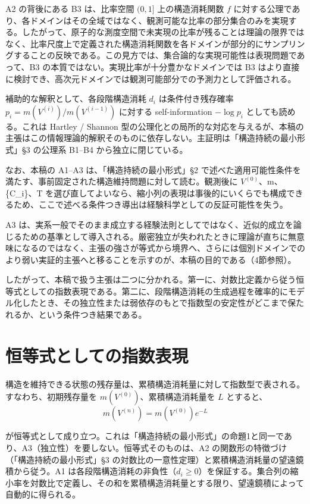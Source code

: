 \documentclass[12pt,a4paper]{article}
\begin{document}
A2 の背後にある B3 は、比率空間 \((0,1]\) 上の構造消耗関数 \(f\) に対する公理であり、各ドメインはその全域ではなく、観測可能な比率の部分集合のみを実現する。したがって、原子的な測度空間で未実現の比率が残ることは理論の限界ではなく、比率尺度上で定義された構造消耗関数を各ドメインが部分的にサンプリングすることの反映である。この見方では、集合論的な実現可能性は表現問題であって、B3 の本質ではない。実現比率が十分豊かなドメインでは B3 はより直接に検討でき、高次元ドメインでは観測可能部分での予測力として評価される。

補助的な解釈として、各段階構造消耗 \(d_i\) は条件付き残存確率 \(p_i = m(V^{(i)})/m(V^{(i-1)})\) に対する self-information \(-\log p_i\) としても読める。これは Hartley / Shannon 型の公理化との局所的な対応を与えるが、本稿の主張はこの情報理論的解釈そのものに依存しない。主証明は「構造持続の最小形式」§3 の公理系 B1--B4 から独立に閉じている。

なお、本稿の A1--A3 は、「構造持続の最小形式」§2 で述べた適用可能性条件を満たす、事前固定された構造維持問題に対して読む。観測後に \(V^{(0)}\)、m、\{C\_i\}、T を選び直してよいなら、縮小列の表現は事後的にいくらでも構成できるため、ここで述べる条件つき導出は経験科学としての反証可能性を失う。

A3 は、実系一般でそのまま成立する経験法則としてではなく、近似的成立を論じるための基準として導入される。厳密独立が失われたときに理論が直ちに無意味になるのではなく、主張の強さが等式から境界へ、さらには個別ドメインでのより弱い実証的主張へと移ることを示すのが、本稿の目的である（4節参照）。

したがって、本稿で扱う主張は二つに分かれる。第一に、対数比定義から従う恒等式としての指数表現である。第二に、段階構造消耗の生成過程を確率的にモデル化したとき、その独立性または弱依存のもとで指数型の安定性がどこまで保たれるか、という条件つき結果である。

\section{恒等式としての指数表現}\label{ux6052ux7b49ux5f0fux3068ux3057ux3066ux306eux6307ux6570ux8868ux73fe}

構造を維持できる状態の残存量は、累積構造消耗量に対して指数型で表される。すなわち、初期残存量を \(m(V^{(0)})\)、累積構造消耗量を \(L\) とすると、 \[
m(V^{(n)}) = m(V^{(0)}) e^{-L}
\]

が恒等式として成り立つ。これは「構造持続の最小形式」の命題1と同一であり、A3（独立性）を要しない。恒等式そのものは、A2 の関数形の特徴づけ（「構造持続の最小形式」§3 の対数比の一意性定理）と累積構造消耗量の望遠鏡積から従う。A1 は各段階構造消耗の非負性（\(d_i \ge 0\)）を保証する。集合列の縮小率を対数比で定義し、その和を累積構造消耗量とする限り、望遠鏡積によって自動的に得られる。
\end{document}
